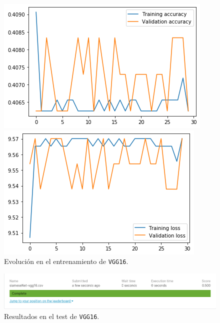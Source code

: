 \documentclass[11pt,a4paper]{article}
\begin{document}
\begin{figure}[H]
\centering
\begin{minipage}{0.5\textwidth}
  \centering
  \includegraphics[scale=0.5]{img/accuracy-vgg16.png}
\end{minipage}%
\begin{minipage}{0.5\textwidth}
  \centering
  \includegraphics[scale=0.5]{img/loss-vgg16.png}
\end{minipage}
\caption{Evolución en el entrenamiento de \texttt{VGG16}.}
\label{fig:graph-vgg16}
\end{figure}

\begin{figure}[H]
    \centering
    \includegraphics[scale=0.55]{img/siameseNet-vgg16.png}
    \caption{Resultados en el test de \texttt{VGG16}.}
    \label{fig:test-vgg16}
\end{figure}
\end{document}
